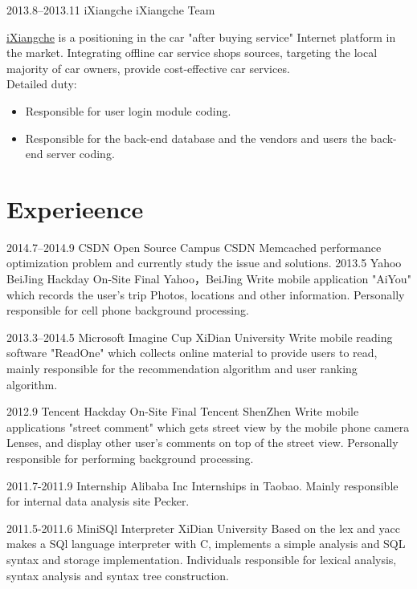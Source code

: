 \documentclass[]{friggeri-cv} %
\begin{document}
\begin{entrylist}
{\begin{itemize}
\end{itemize}
}
\entry
{2013.8--2013.11}
{iXiangche}
{iXiangche Team}
{\href{http://www.ixiangche.com/}{iXiangche} is a positioning in the car "after
    buying service" Internet platform in the market. Integrating offline car
    service shops sources, targeting the local majority of car owners, provide
    cost-effective car services.\\
Detailed duty:
\begin{itemize}
  \item Responsible for user login module coding.
  \item Responsible for the back-end database and the vendors and users the back-end server coding.
\end{itemize}

}
\end{entrylist}

\section{Experieence}

\begin{entrylist}
\entry
{2014.7--2014.9}
{CSDN Open Source Campus}
{CSDN}
{Memcached performance optimization problem and currently study the issue and
solutions.}
\entry
{2013.5}
{Yahoo BeiJing Hackday On-Site Final}
{Yahoo，BeiJing}
{Write mobile application "AiYou" which records the user's trip Photos, locations and other information. Personally responsible for cell phone background processing.}

\entry
{2013.3--2014.5}
{Microsoft Imagine Cup}
{XiDian University}
{Write mobile reading software "ReadOne" which collects online material to provide users to read, mainly responsible for the recommendation algorithm and user ranking algorithm.}


\entry
{2012.9}
{Tencent Hackday On-Site Final}
{Tencent ShenZhen}
{Write mobile applications "street comment" which gets street view by the mobile phone camera
Lenses, and display other user's comments on top of the street view.
Personally responsible for performing background processing.}

\entry
{2011.7-2011.9}
{Internship}
{Alibaba Inc}
{Internships in Taobao. Mainly responsible for internal data analysis site Pecker.}


\entry
{2011.5-2011.6}
{MiniSQl Interpreter}
{XiDian University}
{Based on the lex and yacc makes a SQl language interpreter with C, implements a simple analysis and SQL syntax
and storage implementation. Individuals responsible for lexical analysis, syntax analysis and syntax tree construction. }

\end{entrylist}
\end{document}
